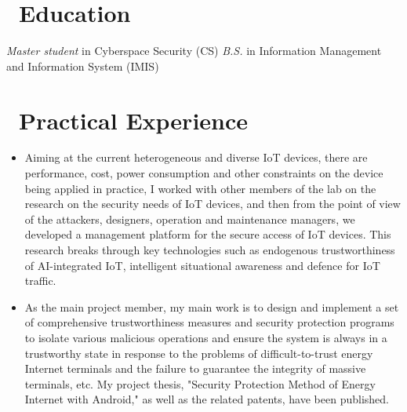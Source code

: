 \documentclass{resume}
\begin{document}



\section{\faGraduationCap\ Education}
\textit{Master student} in Cyberspace Security (CS)
\textit{B.S.} in Information Management and Information System (IMIS)

\section{\faUsers\ Practical Experience}

\begin{itemize}
  \item Aiming at the current heterogeneous and diverse IoT devices, there are performance, cost, power consumption and other constraints on the device being applied in practice, I worked with other members of the lab on the research on the security needs of IoT devices, and then from the point of view of the attackers, designers, operation and maintenance managers, we developed a management platform for the secure access of IoT devices. This research breaks through key technologies such as endogenous trustworthiness of AI-integrated IoT, intelligent situational awareness and defence for IoT traffic.
\end{itemize}

\begin{itemize}
  \item As the main project member, my main work is to design and implement a set of comprehensive trustworthiness measures and security protection programs to isolate various malicious operations and ensure the system is always in a trustworthy state in response to the problems of difficult-to-trust energy Internet terminals and the failure to guarantee the integrity of massive terminals, etc. My project thesis, "Security Protection Method of Energy Internet with Android," as well as the related patents, have been published.
\end{itemize}
\end{document}
